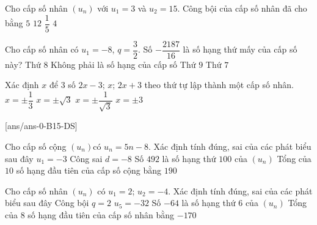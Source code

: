 \begin{ex}%
	Cho cấp số nhân $\left(u_n\right)$ với $u_1=3$ và $u_2=15$. Công bội của cấp số nhân đã cho bằng
	\choice
	{\True $ 5$}
	{$ 12$}
	{$\dfrac{1}{5}$}
	{$ 4$}
\end{ex}

\begin{ex}%
	Cho cấp số nhân có $u_1=-8$, $q=\dfrac{3}{2}$. Số $-\dfrac{2187}{16}$ là số hạng thứ mấy của cấp số này?
	\choice
	{\True Thứ $8$}
	{Không phải là số hạng của cấp số}
	{Thứ $9$}
	{Thứ $7$}
\end{ex}

\begin{ex}%
Xác định $ x$ để $3$ số $2x-3$; $x$; $2x+3$ theo thứ tự lập thành một cấp số nhân.
	\choice
	{$x=\pm\dfrac{1}{3}$}
	{\True $x=\pm\sqrt3$}
	{$x=\pm\dfrac{1}{\sqrt 3}$}
	{$x=\pm 3$}
\end{ex}

\cauds
{}[ans/ans-0-B15-DS]
\begin{ex}%
	Cho cấp số cộng $\left(u_n\right)$có $u_n=5n-8$. Xác định tính đúng, sai của các phát biểu sau đây
	\choiceTF
	{\True $u_1=-3$}
	{Công sai $ d=-8$}
	{\True Số $492$ là số hạng thứ $100$ của $\left(u_n\right)$}
	{Tổng của $10$ số hạng đầu tiên của cấp số cộng bằng $ 190$}
\end{ex}

\begin{ex}%
Cho cấp số nhân $\left(u_n\right)$ có $u_1=2$; $u_2=-4$. Xác định tính đúng, sai của các phát biểu sau đây
\choiceTF
{Công bội $ q=2$}
{$u_5=-32$}
{\True Số $-64$ là số hạng thứ $6$ của $\left(u_n\right)$}
{\True Tổng của $8$ số hạng đầu tiên của cấp số nhân bằng $-170$}
\end{ex}

